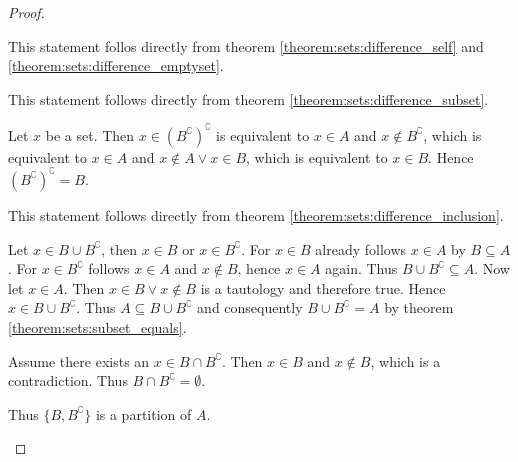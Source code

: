 \begin{proof}
    \begin{proofenumerate}
        \item This statement follos directly from theorem \ref{theorem:sets:difference_self} and \ref{theorem:sets:difference_emptyset}.
        \item This statement follows directly from theorem \ref{theorem:sets:difference_subset}.
        \item Let $x$ be a set. Then $x\in (B^\complement)^\complement$ is equivalent to $x\in A$ and $x\notin B^\complement$, which is equivalent to $x\in A$ and $x\notin A\lor x\in B$, which is equivalent to $x\in B$. Hence $(B^\complement)^\complement=B$.
        \item This statement follows directly from theorem \ref{theorem:sets:difference_inclusion}.
        \item {} Let $x\in B\cup B^\complement$, then $x\in B$ or $x\in B^\complement$. For $x\in B$ already follows $x\in A$ by $B\subseteq A$. For $x\in B^\complement$ follows $x\in A$ and $x\notin B$, hence $x\in A$ again. Thus $B\cup B^\complement\subseteq A$. Now let $x\in A$. Then $x\in B\lor x\notin B$ is a tautology and therefore true. Hence $x\in B\cup B^\complement$. Thus $A\subseteq B\cup B^\complement$ and consequently $B\cup B^\complement=A$ by theorem \ref{theorem:sets:subset_equals}.
        
         Assume there exists an $x\in B\cap B^\complement$. Then $x\in B$ and $x\notin B$, which is a contradiction. Thus $B\cap B^\complement=\emptyset$.

        Thus $\{B,B^\complement\}$ is a partition of $A$.
    \end{proofenumerate}
\end{proof}

